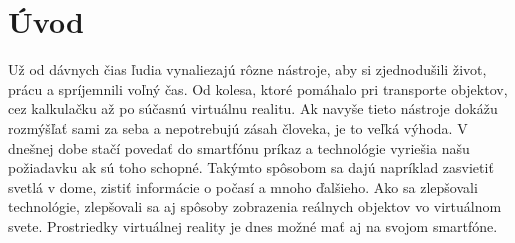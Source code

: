 \section*{Úvod}

Už od dávnych čias ľudia vynaliezajú rôzne nástroje, aby si zjednodušili život, prácu a spríjemnili voľný čas.
Od kolesa, ktoré pomáhalo pri transporte objektov, cez kalkulačku až po súčasnú virtuálnu realitu.
Ak navyše tieto nástroje dokážu rozmýšľať sami za seba a nepotrebujú zásah človeka, je to veľká výhoda.
V dnešnej dobe stačí povedať do smartfónu príkaz a technológie vyriešia našu požiadavku ak sú toho schopné.
Takýmto spôsobom sa dajú napríklad zasvietiť svetlá v dome, zistiť informácie o počasí a mnoho ďalšieho.
Ako sa zlepšovali technológie, zlepšovali sa aj spôsoby zobrazenia reálnych objektov vo virtuálnom svete.
Prostriedky virtuálnej reality je dnes možné mať aj na svojom smartfóne.
